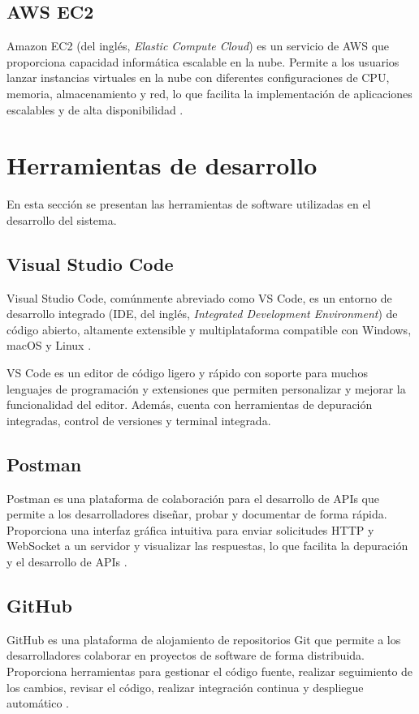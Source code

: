 \subsection{AWS EC2}

Amazon EC2 (del inglés, \textit{Elastic Compute Cloud}) es un servicio de AWS
que proporciona capacidad informática escalable en la nube. Permite a los
usuarios lanzar instancias virtuales en la nube con diferentes configuraciones
de CPU, memoria, almacenamiento y red, lo que facilita la implementación de
aplicaciones escalables y de alta disponibilidad \cite{AWS_EC2}.


\section{Herramientas de desarrollo}

En esta sección se presentan las herramientas de software utilizadas en el
desarrollo del sistema.

\subsection{Visual Studio Code}

Visual Studio Code, comúnmente abreviado como VS Code, es un entorno de
desarrollo integrado (IDE, del inglés, \textit{Integrated Development
	Environment}) de código abierto, altamente extensible y multiplataforma
compatible con Windows, macOS y Linux \cite{VSCode}.

VS Code es un editor de código ligero y rápido con soporte para muchos
lenguajes de programación y extensiones que permiten personalizar y mejorar la
funcionalidad del editor. Además, cuenta con herramientas de depuración
integradas, control de versiones y terminal integrada.%

\subsection{Postman}

Postman es una plataforma de colaboración para el desarrollo de APIs que
permite a los desarrolladores diseñar, probar y documentar de forma rápida.
Proporciona una interfaz gráfica intuitiva para enviar solicitudes HTTP y
WebSocket a un servidor y visualizar las respuestas, lo que facilita la
depuración y el desarrollo de APIs \cite{Postman}.

\subsection{GitHub}

GitHub es una plataforma de alojamiento de repositorios Git \cite{Git} que
permite a los desarrolladores colaborar en proyectos de software de forma
distribuida. Proporciona herramientas para gestionar el código fuente, realizar
seguimiento de los cambios, revisar el código, realizar integración continua y
despliegue automático \cite{Github}.

